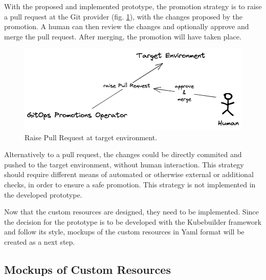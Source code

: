 With the proposed and implemented prototype,
the promotion strategy is to raise a pull request at the Git provider
(fig. \ref{fig:raise-pull-request-and-approve}),
with the changes proposed by the promotion.
A human can then review the changes and optionally approve and merge the pull request.
After merging, the promotion will have taken place.

\begin{figure}[h]
	\centering
	\includegraphics[width=1.00\linewidth]{assets/raise-pull-request-and-approve.png}
	\caption{Raise Pull Request at target environment.
	}
	\label{fig:raise-pull-request-and-approve}	
\end{figure}

Alternatively to a pull request, the changes could be directly
commited and pushed to the target environment,
without human interaction. This strategy should require different means
of automated or otherwise external or additional checks, in order to ensure a safe promotion.
This strategy is not implemented in the developed prototype.

Now that the custom resources are designed,
they need to be implemented.
Since the decision for the prototype is to be developed
with the Kubebuilder framework and follow its style,
mockups of the custom resources in Yaml format
will be created as a next step.









\subsection{Mockups of Custom Resources}


